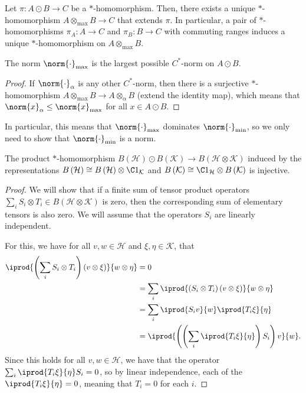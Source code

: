 \documentclass[10pt]{mypackage}
\begin{document}
\begin{proposition}
  Let $\pi\colon A\odot B\rightarrow C$ be a $\ast$-homomorphism. Then, there exists a unique $\ast$-homomorphism $A\otimes_{\max}B\rightarrow C$ that extends $\pi$. In particular, a pair of $\ast$-homomorphisms $\pi_A\colon A\rightarrow C$ and $\pi_B\colon B\rightarrow C$ with commuting ranges induces a unique $\ast$-homomorphism on $A\otimes_{\max}B$.
\end{proposition}
\begin{corollary}
  The norm $\norm{\cdot}_{\max}$ is the largest possible $C^{\ast}$-norm on $A\odot B$.
\end{corollary}
\begin{proof}
  If $\norm{\cdot}_{\alpha}$ is any other $C^{\ast}$-norm, then there is a surjective $\ast$-homomorphism $A\otimes_{\max}B\rightarrow A\otimes_{\alpha}B$ (extend the identity map), which means that $\norm{x}_{\alpha}\leq \norm{x}_{\max}$ for all $x\in A\odot B$.
\end{proof}
In particular, this means that $\norm{\cdot}_{\max}$ dominates $\norm{\cdot}_{\min}$, so we only need to show that $\norm{\cdot}_{\min}$ is a norm.
\begin{lemma}
  The product $\ast$-homomorphism $B\left( \mathcal{H} \right)\odot B\left( \mathcal{K} \right)\rightarrow B\left( \mathcal{H}\otimes \mathcal{K} \right)$ induced by the representations $B\left( \mathcal{H} \right)\cong B\left( \mathcal{H} \right)\otimes \C 1_{\mathcal{K}}$ and $B\left( \mathcal{K} \right)\cong \C1_{\mathcal{H}}\otimes B\left( \mathcal{K} \right)$ is injective.
\end{lemma}
\begin{proof}
  We will show that if a finite sum of tensor product operators $\sum_{i}S_i\otimes T_i\in B\left( \mathcal{H}\otimes \mathcal{K} \right)$ is zero, then the corresponding sum of elementary tensors is also zero. We will assume that the operators $S_i$ are linearly independent.

  For this, we have for all $v,w\in \mathcal{H}$ and $\xi,\eta\in \mathcal{K}$, that
  \begin{align*}
    \iprod{\left( \sum_{i}S_i\otimes T_i \right)\left( v\otimes \xi \right)}{w\otimes \eta} &= 0\\
                                                                                            &= \sum_{i} \iprod{\left( S_i\otimes T_i \right)\left( v\otimes \xi \right)}{w\otimes \eta}\\
                                                                                            &= \sum_{i} \iprod{S_iv}{w} \iprod{T_i\xi}{\eta}\\
                                                                                            &= \iprod{\left( \left( \sum_{i} \iprod{T_i\xi}{\eta} \right)S_i \right)v}{w}.
  \end{align*}
  Since this holds for all $v,w\in \mathcal{H}$, we have that the operator $\sum_{i} \iprod{T_i\xi}{\eta}S_i = 0$, so by linear independence, each of the $ \iprod{T_i\xi}{\eta} = 0 $, meaning that $T_i = 0$ for each $i$.
\end{proof}
\end{document}
